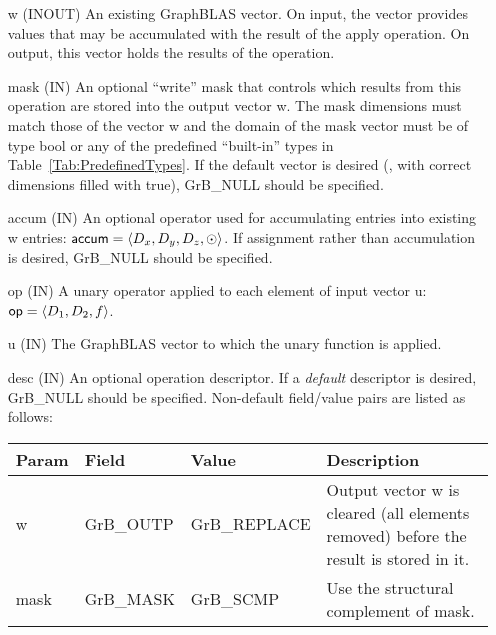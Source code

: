 \begin{itemize}[leftmargin=1in]
    \item[{\sf w}]    ({\sf INOUT}) An existing GraphBLAS vector.  On input,
    the vector provides values that may be accumulated with the result of the
    apply operation.  On output, this vector holds the results of the
    operation.

    \item[{\sf mask}] ({\sf IN}) An optional ``write'' mask that controls which
    results from this operation are stored into the output vector {\sf w}. The 
    mask dimensions must match those of the vector {\sf w} and the domain of the
    {\sf mask} vector must be of type {\sf bool} or any of the predefined 
    ``built-in'' types in Table~\ref{Tab:PredefinedTypes}.  If the default vector
    is desired (\ie, with correct dimensions filled with {\sf true}), 
    {\sf GrB\_NULL} should be specified.

    \item[{\sf accum}]    ({\sf IN}) An optional operator used for accumulating
    entries into existing {\sf w} entries: ${\sf accum} = \langle D_x,
    D_y, D_z,\odot \rangle$. If assignment rather than accumulation is
    desired, {\sf GrB\_NULL} should be specified.

    \item[{\sf op}]	({\sf IN}) A unary operator applied to 
	    each element of input vector {\sf u}: ${\sf op} = \langle D_1,D_2,f \rangle$.
    \item[{\sf u}]       ({\sf IN}) The GraphBLAS vector to which the unary function
    is applied.

    \item[{\sf desc}] ({\sf IN}) An optional operation descriptor. If
    a \emph{default} descriptor is desired, {\sf GrB\_NULL} should be
    specified. Non-default field/value pairs are listed as follows:  \\

    \begin{tabular}{lllp{2.5in}}
        Param & Field  & Value & Description \\
        \hline
        {\sf w}    & {\sf GrB\_OUTP} & {\sf GrB\_REPLACE} & Output vector {\sf w}
        is cleared (all elements removed) before the result is stored in it. \\
        
        {\sf mask} & {\sf GrB\_MASK} & {\sf GrB\_SCMP}   & Use the structural 
        complement of {\sf mask}. \\
    \end{tabular}
\end{itemize}

